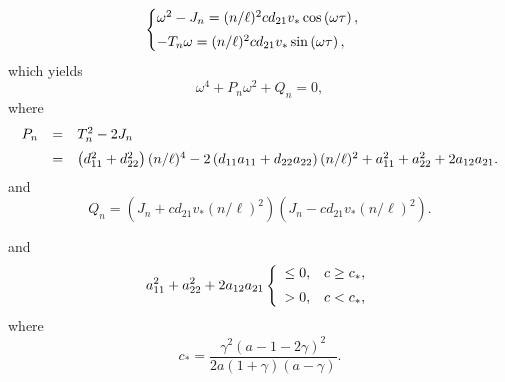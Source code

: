 \documentclass[11pt]{article}
\theoremstyle{definition}
\theoremstyle{remark}
\numberwithin{equation}{section}
\begin{document}
\begin{equation}
\label{RIPARTS}
  \begin{cases}
\omega^2-J_n= (n/\ell)^2cd_{21}v_*\cos\left(\omega\tau\right),\vspace{0.1cm}\\
-T_n\omega=(n/\ell)^2cd_{21}v_*\sin\left(\omega\tau\right),
  \end{cases}
 \end{equation}
which yields
\begin{equation}
\label{OMGE}
\omega^4+P_n\omega^2+Q_n=0,
\end{equation}
where
\begin{equation}
\label{PN}
\begin{array}{lll}
P_n&=&T_n^2-2J_n\vspace{0.2cm}\\
&=&\left(d_{11}^2+d_{22}^2\right)(n/\ell)^4-2\left(d_{11}a_{11}+d_{22}a_{22}\right)(n/\ell)^2
+a_{11}^2+a_{22}^2+2a_{12}a_{21}.
\end{array}
\end{equation}
and
\begin{equation}
\label{QN}
Q_n=\left(J_n+cd_{21}v_*(n/\ell)^2\right)\left(J_n-cd_{21}v_*(n/\ell)^2\right).
\end{equation}


and
$$
a_{11}^2+a_{22}^2+2a_{12}a_{21}\left\{\begin{array}{ll}
\leq 0, &  c\geq c_*,\vspace{0.2cm}\\
>0, &  c<c_*,
\end{array}\right.
$$
where
\begin{equation}
\label{C-star}
c_*=\frac{\gamma^2(a-1-2\gamma)^2}{2a(1+\gamma)(a-\gamma)}.
\end{equation}
\end{document}
